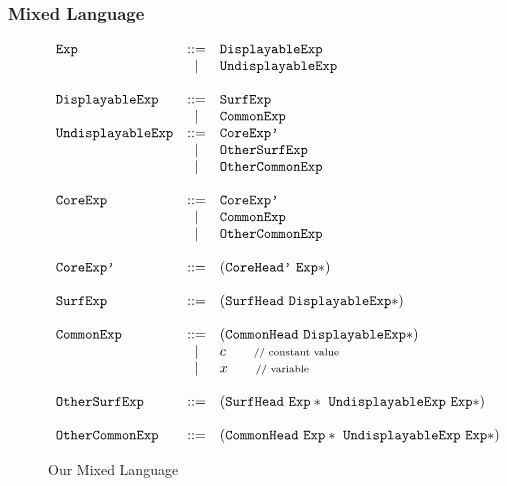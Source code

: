 \subsubsection{Mixed Language}
\begin{figure}[t]
\begin{centering}
{\footnotesize
\[
			\begin{array}{lcl}
			\mbox{\tt Exp} &::=& \mbox{\tt DisplayableExp}\\
			&|& \mbox{\tt UndisplayableExp}\\
\\
			\mbox{\tt DisplayableExp} &::=& \mbox{\tt SurfExp}\\
			&|& \mbox{\tt CommonExp}
\\
			\mbox{\tt UndisplayableExp} &::=& \mbox{\tt CoreExp'}\\
			&|& \mbox{\tt OtherSurfExp}\\
			&|& \mbox{\tt OtherCommonExp}\\
\\
			\mbox{\tt CoreExp} &::=& \mbox{\tt CoreExp'}\\
						 &|& \mbox{\tt CommonExp}\\
						 &|& \mbox{\tt OtherCommonExp}\\
\\
			\mbox{\tt CoreExp'} &::=& (\mbox{\tt CoreHead'}~\mbox{\tt Exp}*)\\
\\
			\mbox{\tt SurfExp} &::=& (\mbox{\tt SurfHead}~\mbox{\tt DisplayableExp}*)\\
\\
			\mbox{\tt CommonExp} &::=& (\mbox{\tt CommonHead}~\mbox{\tt DisplayableExp}*)\\
			&|& c \qquad \mbox{{\scriptsize // constant value}}\\
			&|& x \qquad \mbox{{\scriptsize // variable}} \\
\\
			\mbox{\tt OtherSurfExp} &::=& (\mbox{\tt SurfHead}~\mbox{\tt Exp}*~\mbox{\tt UndisplayableExp}~\mbox{\tt Exp}*)\\
\\
			\mbox{\tt OtherCommonExp} &::=& (\mbox{\tt CommonHead}~\mbox{\tt Exp}*~\mbox{\tt UndisplayableExp}~\mbox{\tt Exp}*)
			\end{array}
			\]
}

\end{centering}
\caption{Our Mixed Language}
\label{fig:mix}
\end{figure}

